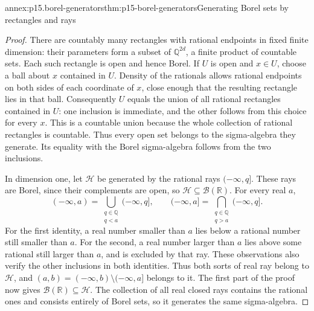 \begin{annexitem}{annex:p15.borel-generators}{thm:p15-borel-generators}{Generating Borel sets by rectangles and rays}
\begin{proof}
There are countably many rectangles with rational endpoints in fixed
finite dimension: their parameters form a subset of \(\mathbb Q^{2d}\),
a finite product of countable sets. Each such rectangle is open and
hence Borel. If \(U\) is open and \(x\in U\), choose a ball about
\(x\) contained in \(U\). Density of the rationals allows rational
endpoints on both sides of each coordinate of \(x\), close enough that
the resulting rectangle lies in that ball. Consequently \(U\) equals
the union of all rational rectangles contained in \(U\): one inclusion
is immediate, and the other follows from this choice for every \(x\).
This is a countable union because the whole collection of rational
rectangles is countable. Thus every open set belongs to the sigma-algebra
they generate. Its equality with the Borel sigma-algebra follows from
the two inclusions.

In dimension one, let \(\mathcal H\) be generated by the rational
rays \((-\infty,q]\). These rays are Borel, since their complements
are open, so \(\mathcal H\subseteq\mathcal B(\mathbb R)\).
For every real \(a\),
\[
 (-\infty,a)=\bigcup_{\substack{q\in\mathbb Q\\q<a}}(-\infty,q],
 \qquad
 (-\infty,a]=\bigcap_{\substack{q\in\mathbb Q\\q>a}}(-\infty,q].
\]
For the first identity, a real number smaller than \(a\) lies below
a rational number still smaller than \(a\). For the second, a real
number larger than \(a\) lies above some rational still larger than
\(a\), and is excluded by that ray. These observations also verify
the other inclusions in both identities. Thus both sorts of real ray
belong to \(\mathcal H\), and
\((a,b)=(-\infty,b)\setminus(-\infty,a]\) belongs to it.
The first part of the proof now gives
\(\mathcal B(\mathbb R)\subseteq\mathcal H\).
The collection of all real closed rays contains the rational ones and
consists entirely of Borel sets, so it generates the same sigma-algebra.
\end{proof}
\end{annexitem}

